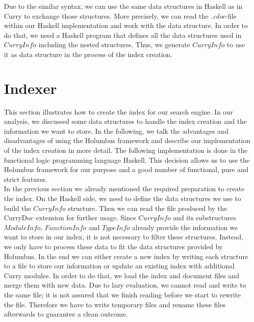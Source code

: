 \documentclass[%
	pdftex,%
	a4paper,%
	oneside,%
	chapterprefix,%
	headsepline,%
	12pt%
]{scrbook}
\newcommand{\Conid}[1]{\mathit{#1}}
\begin{document}
Due to the similar syntax, we can use the same data structures in
Haskell as in Curry to exchange those structures. More precisely, we
can read the \emph{.cdoc}-file within our Haskell implementation and
work with the data structure. In order to do that, we need a Haskell
program that defines all the data structures used in \ensuremath{\Conid{CurryInfo}}
including the nested structures. Thus, we generate \ensuremath{\Conid{CurryInfo}} to use
it as data structure in the process of the index creation.

\section{Indexer}\label{implementation:index}

This section illustrates how to create the index for our search
engine. In our analysis, we discussed some data structures to handle
the index creation and the information we want to store. In the
following, we talk the advantages and disadvantages of using the
Holumbus framework and describe our implementation of the index
creation in more detail.
The following implementation is done in the functional logic
programming language Haskell. This decision allows us to use the
Holumbus framework for our purpose and a good number of functional,
pure and strict features.\\

In the previous section we already mentioned the required preparation
to create the index. On the Haskell side, we need to define the data
structures we use to build the \ensuremath{\Conid{CurryInfo}} structure. Then we can read
the file produced by the CurryDoc extension for further usage. Since
\ensuremath{\Conid{CurryInfo}} and its substructures \ensuremath{\Conid{ModuleInfo}}, \ensuremath{\Conid{FunctionInfo}} and
\ensuremath{\Conid{TypeInfo}} already provide the information we want to store in our
index, it is not necessary to filter these structures. Instead, we
only have to process these data to fit the data structures provided by
Holumbus. In the end we can either create a new index by writing each
structure to a file to store our information or update an existing
index with additional Curry modules. In order to do that, we load the
index and document files and merge them with new data. Due to lazy
evaluation, we cannot read and write to the same file; it is
not assured that we finish reading before we start to rewrite the
file. Therefore we have to write temporary files and rename these
files afterwards to guarantee a clean outcome.
\end{document}
